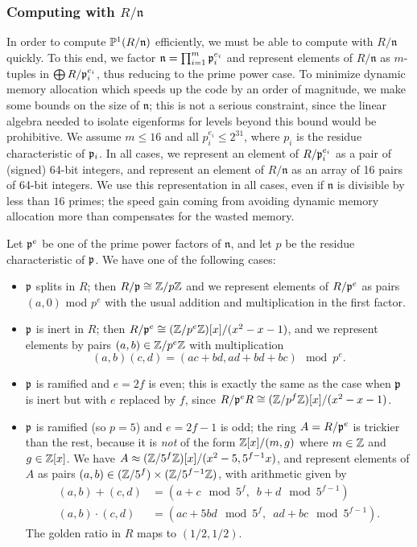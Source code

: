 \documentclass{amsart}
\newcommand{\n}{\mathfrak{n}}
\begin{document}
\subsubsection{Computing with $R/\n$}
In order to compute $\P^1(R/\n)$ efficiently, we must be able to
compute with $R/\n$ quickly.  To this end, we factor $\n =
\prod_{i=1}^m \p_i^{e_i}$ and represent elements of $R/\n$ as
$m$-tuples in $\bigoplus R/\mathfrak{p}_i^{e_i}$, thus reducing to the prime
power case.  To minimize dynamic memory allocation which speeds up the
code by an order of magnitude, we make some bounds on the size of
$\n$; this is not a serious constraint, since the linear algebra
needed to isolate eigenforms for levels beyond this bound would be
prohibitive.  We assume $m\leq 16$ and all $p_i^{e_i}\leq 2^{31}$,
where $p_i$ is the residue characteristic of $\mathfrak{p}_i$.  In all cases, we represent an
element of $R/\mathfrak{p}_i^{e_i}$ as a pair of (signed) 64-bit integers, and
represent an element of $R/\n$ as an array of 16 pairs of 64-bit
integers. We use this representation in all cases, even if $\n$ is
divisible by less than $16$ primes; the speed gain coming from
avoiding dynamic memory allocation more than compensates for the
wasted memory.

Let $\mathfrak{p}^e$ be one of the prime power factors of $\n$, and let $p$ be the residue
characteristic of $\mathfrak{p}$. We have one of the following cases:
\begin{itemize}
\item $\mathfrak{p}$ splits in $R$; then $R/\mathfrak{p}\cong \mathbb{Z}/p\mathbb{Z}$ and we represent elements
of $R/\mathfrak{p}^e$ as pairs $(a,0)$ mod $p^e$ with the usual addition and multiplication
in the first factor.
\item $\mathfrak{p}$ is inert in $R$; then $R/\mathfrak{p}^e\cong (\mathbb{Z}/p^e\mathbb{Z})[x]/(x^2-x-1)$,
and we represent elements by pairs $(a,b) \in \mathbb{Z}/p^e\mathbb{Z}$ with multiplication
$$(a,b)(c,d) = (ac+bd,ad+bd+bc) \mod p^e.$$
\item $\mathfrak{p}$ is ramified and $e=2f$ is even; this is exactly the
same as the case when $\mathfrak{p}$ is inert but with $e$ replaced by $f$,
since $R/\mathfrak{p}^eR \cong (\mathbb{Z}/p^{f}\mathbb{Z})[x]/(x^2-x-1)$.
\item $\mathfrak{p}$ is ramified (so $p=5$) and $e=2f-1$ is odd; the ring $A=R/\mathfrak{p}^e$
  is trickier than the rest, because it is {\em not} of the form
  $\mathbb{Z}[x]/(m,g)$ where $m\in\mathbb{Z}$ and $g \in\mathbb{Z}[x]$.  We have $A \approx
  (\mathbb{Z}/5^f\mathbb{Z})[x]/(x^2-5, 5^{f-1}x)$, and represent elements of $A$ as
  pairs $(a,b) \in (\mathbb{Z}/5^f)\times (\mathbb{Z}/5^{f-1}\mathbb{Z})$, with arithmetic
  given by
\begin{align*}
(a,b) + (c,d) &= (a+c \mod 5^f,\,\,\, b+d \mod 5^{f-1})\\
(a,b)\cdot (c,d) &= (ac+5bd \mod 5^f,\,\,\, ad+bc \mod 5^{f-1}).
\end{align*}
The golden ratio in $R$ maps to $(1/2,1/2)$.
\end{itemize}
\end{document}
